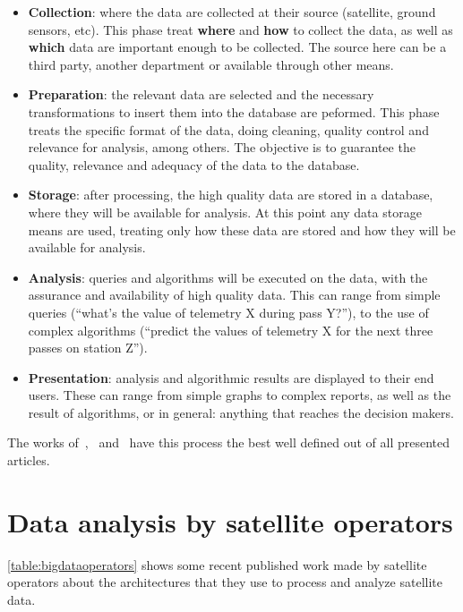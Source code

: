 \begin{itemize}[noitemsep]
  \item \textbf{Collection}: where the data are collected at their source (satellite, ground sensors, etc).
    This phase treat \textbf{where} and \textbf{how} to collect the data, as well as \textbf{which} data are important enough to be collected.
    The source here can be a third party, another department or available through other means.
  \item \textbf{Preparation}: the relevant data are selected and the necessary transformations to insert them into the database are peformed.
    This phase treats the specific format of the data, doing cleaning, quality control and relevance for analysis, among others.
    The objective is to guarantee the quality, relevance and adequacy of the data to the database.
  \item \textbf{Storage}: after processing, the high quality data are stored in a database, where they will be available for analysis.
    At this point any data storage means are used, treating only how these data are stored and how they will be available for analysis.
  \item \textbf{Analysis}: queries and algorithms will be executed on the data, with the assurance and availability of high quality data.
    This can range from simple queries (``what's the value of telemetry X during pass Y?''), to the use of complex algorithms (``predict the values of telemetry X for the next three passes on station Z'').
  \item \textbf{Presentation}: analysis and algorithmic results are displayed to their end users.
    These can range from simple graphs to complex reports, as well as the result of algorithms, or in general: anything that reaches the decision makers.
\end{itemize}

The works of~,~ and~ have this process the best well defined out of all presented articles.

\section{Data analysis by satellite operators}\label{ch:corr:ops}

\autoref{table:bigdataoperators} shows some recent published work made by satellite operators about the architectures that they use to process and analyze satellite data.

